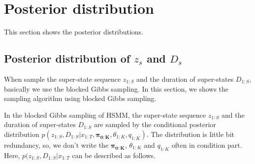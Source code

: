 \documentclass[a4paper]{article}
\begin{document}
	\section{Posterior distribution}
	This section shows the posterior distributions.

	\subsection{Posterior distribution of $z_s$ and $D_s$}
	When sample the super-state sequence $z_{1:S}$ and the duration of super-states $D_{1:S}$, basically we use the blocked Gibbs sampling.
	In this section, we shows the sampling algorithm using blocked Gibbs sampling.
	\par
	In the blocked Gibbs sampling of HSMM, the super-state sequence $z_{1:S}$ and   the duration of super-states $D_{1:S}$ are sampled by the conditional posterior distribution $p(z_{1:S} , D_{1:S}| x_{1:T}, \boldsymbol{\pi_{0:K}}, \theta_{1:K}, q_{1:K})$.
	The distribution is little bit redundancy, so, we don't write the $\boldsymbol{\pi_{0:K}}$, $\theta_{1:K}$ and $q_{1:K}$ often in condition part.
	Here, $p(z_{1:S} , D_{1:S}| x_{1:T}$ can be described as follows.
\end{document}
